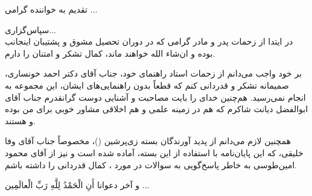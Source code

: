 \clearpage\newpage
 \thispagestyle{empty}
\vspace{4cm}

{ \nastaliq
{\Huge
\hspace{1cm}
تقدیم به خواننده گرامی ...
\vspace{1.5cm}

\hspace{4cm}
}}

\newpage



\newpage\thispagestyle{empty}
{ \nastaliq
سپاس‌گزاری...
}
\\[2cm]
در ایتدا از زحمات پدر و مادر گرامی که در دوران تحصیل مشوق و پشتیبان اینجانب بوده و ان‌شاء الله خواهند ماند، کمال تشکر و امتنان را دارم.

بر خود واجب می‌دانم از زحمات استاد  راهنمای خود، جناب آقای دکتر احمد خونساری، صمیمانه تشکر و  قدردانی کنم  که قطعاً بدون  راهنمایی‌های‌ ایشان، این مجموعه  به انجام نمی‌رسید. هم‌چنین  خدای را بایت مصاحبت و آشنایی دوست گرانقدرم جناب آقای ابوالفضل دیانت شاکرم که هم در زمینه علمی و هم اخلاقی مشاور خوبی برای من بوده و هستند.

همچنین لازم می‌دانم از پدید آورندگان بسته زی‌پرشین (\lr{\XePersian})، مخصوصاً جناب آقای  وفا خلیقی، که این پایان‌نامه با استفاده از این بسته، آماده شده است و نیز از  آقای محمود امین‌طوسی به خاطر پاسخ‌گویی به سوالات در مورد  \lr{\LaTeX}،  کمال قدردانی را داشته باشم.

و آخر دعوانا أَنِ الْحَمْدُ لِلَّهِ رَبِّ الْعالَمِین ...


